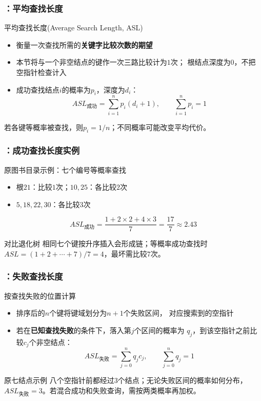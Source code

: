 \begin{frame}
    \frametitle{\insertsectionhead：平均查找长度}
    \begin{block}{平均查找长度(Average Search Length, ASL)}
        \begin{itemize}
            \item 衡量一次查找所需的\textbf{关键字比较次数的期望}
            \item 本节将与一个非空结点的键作一次三路比较计为$1$次；
                  根结点深度为$0$，不把空指针检查计入
            \item 成功查找结点$i$的概率为$p_i$，深度为$d_i$：
                  \[
                      ASL_{\mathrm{成功}}=\sum_{i=1}^{n}p_i(d_i+1),
                      \qquad \sum_{i=1}^{n}p_i=1
                  \]
        \end{itemize}
    \end{block}
    \small 若各键等概率被查找，则$p_i=1/n$；不同概率可能改变平均代价。
\end{frame}

\begin{frame}
    \frametitle{\insertsectionhead：成功查找长度实例}
    \begin{exampleblock}{原图书目录示例：七个编号等概率查找}
        \begin{itemize}
            \item 根$21$：比较$1$次；$10,25$：各比较$2$次
            \item $5,18,22,30$：各比较$3$次
        \end{itemize}
        \[
            ASL_{\mathrm{成功}}
            =\frac{1+2\times2+4\times3}{7}
            =\frac{17}{7}\approx2.43
        \]
    \end{exampleblock}
    \begin{block}{对比退化树}
        相同七个键按升序插入会形成链；等概率成功查找时
        $ASL=(1+2+\cdots+7)/7=4$，最坏需比较$7$次。
    \end{block}
\end{frame}

\begin{frame}
    \frametitle{\insertsectionhead：失败查找长度}
    \begin{block}{按查找失败的位置计算}
        \begin{itemize}
            \item 排序后的$n$个键将键域划分为$n+1$个失败区间，
                  对应搜索到的空指针
            \item 若在\textbf{已知查找失败}的条件下，落入第$j$个区间的概率为
                  $q_j$，到该空指针之前比较$c_j$个非空结点：
                  \[
                      ASL_{\mathrm{失败}}=\sum_{j=0}^{n}q_jc_j,\qquad
                      \sum_{j=0}^{n}q_j=1
                  \]
        \end{itemize}
    \end{block}
    \begin{exampleblock}{原七结点示例}
        八个空指针前都经过$3$个结点；无论失败区间的概率如何分布，
        $ASL_{\mathrm{失败}}=3$。若混合成功和失败查询，需按两类概率再加权。
    \end{exampleblock}
\end{frame}

